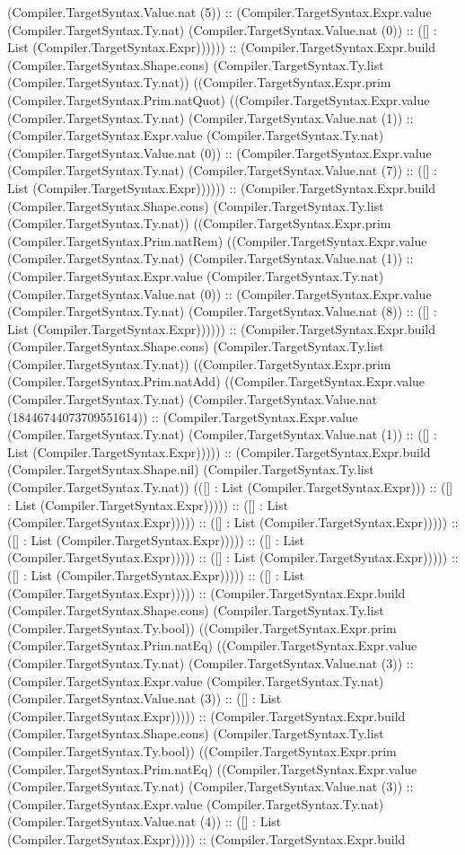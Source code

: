 \documentclass[11pt]{article}
\begin{document}
(Compiler.TargetSyntax.Value.nat (5)) :: (Compiler.TargetSyntax.Expr.value (Compiler.TargetSyntax.Ty.nat) (Compiler.TargetSyntax.Value.nat (0)) :: ([] : List (Compiler.TargetSyntax.Expr)))))) :: (Compiler.TargetSyntax.Expr.build (Compiler.TargetSyntax.Shape.cons) (Compiler.TargetSyntax.Ty.list (Compiler.TargetSyntax.Ty.nat)) ((Compiler.TargetSyntax.Expr.prim (Compiler.TargetSyntax.Prim.natQuot) ((Compiler.TargetSyntax.Expr.value (Compiler.TargetSyntax.Ty.nat) (Compiler.TargetSyntax.Value.nat (1)) :: (Compiler.TargetSyntax.Expr.value (Compiler.TargetSyntax.Ty.nat) (Compiler.TargetSyntax.Value.nat (0)) :: (Compiler.TargetSyntax.Expr.value (Compiler.TargetSyntax.Ty.nat) (Compiler.TargetSyntax.Value.nat (7)) :: ([] : List (Compiler.TargetSyntax.Expr)))))) :: (Compiler.TargetSyntax.Expr.build (Compiler.TargetSyntax.Shape.cons) (Compiler.TargetSyntax.Ty.list (Compiler.TargetSyntax.Ty.nat)) ((Compiler.TargetSyntax.Expr.prim (Compiler.TargetSyntax.Prim.natRem) ((Compiler.TargetSyntax.Expr.value (Compiler.TargetSyntax.Ty.nat) (Compiler.TargetSyntax.Value.nat (1)) :: (Compiler.TargetSyntax.Expr.value (Compiler.TargetSyntax.Ty.nat) (Compiler.TargetSyntax.Value.nat (0)) :: (Compiler.TargetSyntax.Expr.value (Compiler.TargetSyntax.Ty.nat) (Compiler.TargetSyntax.Value.nat (8)) :: ([] : List (Compiler.TargetSyntax.Expr)))))) :: (Compiler.TargetSyntax.Expr.build (Compiler.TargetSyntax.Shape.cons) (Compiler.TargetSyntax.Ty.list (Compiler.TargetSyntax.Ty.nat)) ((Compiler.TargetSyntax.Expr.prim (Compiler.TargetSyntax.Prim.natAdd) ((Compiler.TargetSyntax.Expr.value (Compiler.TargetSyntax.Ty.nat) (Compiler.TargetSyntax.Value.nat (18446744073709551614)) :: (Compiler.TargetSyntax.Expr.value (Compiler.TargetSyntax.Ty.nat) (Compiler.TargetSyntax.Value.nat (1)) :: ([] : List (Compiler.TargetSyntax.Expr))))) :: (Compiler.TargetSyntax.Expr.build (Compiler.TargetSyntax.Shape.nil) (Compiler.TargetSyntax.Ty.list (Compiler.TargetSyntax.Ty.nat)) (([] : List (Compiler.TargetSyntax.Expr))) :: ([] : List (Compiler.TargetSyntax.Expr))))) :: ([] : List (Compiler.TargetSyntax.Expr))))) :: ([] : List (Compiler.TargetSyntax.Expr))))) :: ([] : List (Compiler.TargetSyntax.Expr))))) :: ([] : List (Compiler.TargetSyntax.Expr))))) :: ([] : List (Compiler.TargetSyntax.Expr))))) :: ([] : List (Compiler.TargetSyntax.Expr))))) :: ([] : List (Compiler.TargetSyntax.Expr))))) :: (Compiler.TargetSyntax.Expr.build (Compiler.TargetSyntax.Shape.cons) (Compiler.TargetSyntax.Ty.list (Compiler.TargetSyntax.Ty.bool)) ((Compiler.TargetSyntax.Expr.prim (Compiler.TargetSyntax.Prim.natEq) ((Compiler.TargetSyntax.Expr.value (Compiler.TargetSyntax.Ty.nat) (Compiler.TargetSyntax.Value.nat (3)) :: (Compiler.TargetSyntax.Expr.value (Compiler.TargetSyntax.Ty.nat) (Compiler.TargetSyntax.Value.nat (3)) :: ([] : List (Compiler.TargetSyntax.Expr))))) :: (Compiler.TargetSyntax.Expr.build (Compiler.TargetSyntax.Shape.cons) (Compiler.TargetSyntax.Ty.list (Compiler.TargetSyntax.Ty.bool)) ((Compiler.TargetSyntax.Expr.prim (Compiler.TargetSyntax.Prim.natEq) ((Compiler.TargetSyntax.Expr.value (Compiler.TargetSyntax.Ty.nat) (Compiler.TargetSyntax.Value.nat (3)) :: (Compiler.TargetSyntax.Expr.value (Compiler.TargetSyntax.Ty.nat) (Compiler.TargetSyntax.Value.nat (4)) :: ([] : List (Compiler.TargetSyntax.Expr))))) :: (Compiler.TargetSyntax.Expr.build 
\end{document}
